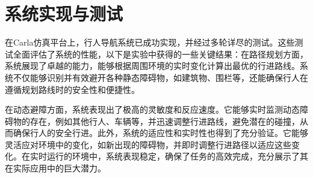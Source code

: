 \section{系统实现与测试}
在Carla仿真平台上，行人导航系统已成功实现，并经过多轮详尽的测试。这些测试全面评估了系统的性能，以下是实验中获得的一些关键结果：在路径规划方面，系统展现了卓越的能力，能够根据周围环境的实时变化计算出最优的行进路线。系统不仅能够识别并有效避开各种静态障碍物，如建筑物、围栏等，还能确保行人在遵循规划路线时的安全性和便捷性。

在动态避障方面，系统表现出了极高的灵敏度和反应速度。它能够实时监测动态障碍物的存在，例如其他行人、车辆等，并迅速调整行进路线，避免潜在的碰撞，从而确保行人的安全行进。此外，系统的适应性和实时性也得到了充分验证。它能够灵活应对环境中的变化，如新出现的障碍物，并即时调整行进路径以适应这些变化。在实时运行的环境中，系统表现稳定，确保了任务的高效完成，充分展示了其在实际应用中的巨大潜力。

